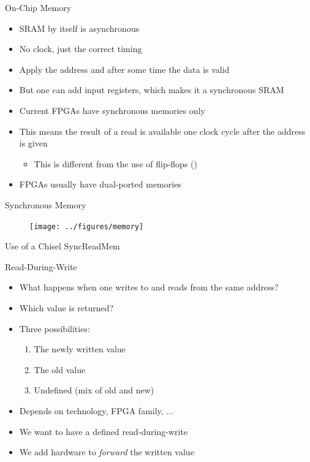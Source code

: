\begin{frame}[fragile]{On-Chip Memory}
\begin{itemize}
\item SRAM by itself is asynchronous
\item No clock, just the correct timing
\item Apply the address and after some time the data is valid
\item But one can add input registers, which makes it a synchronous SRAM
\item Current FPGAs have synchronous memories only
\item This means the result of a read is available one clock cycle after the address is given
\begin{itemize}
\item This is different from the use of flip-flops ()
\end{itemize}
\item FPGAs usually have dual-ported memories
\end{itemize}
\end{frame}

\begin{frame}[fragile]{Synchronous Memory}
\begin{figure}
  \texttt{[image: ../figures/memory]}
\end{figure}
\end{frame}

\begin{frame}[fragile]{Use of a Chisel SyncReadMem}
\end{frame}

\begin{frame}[fragile]{Read-During-Write}
\begin{itemize}
\item What happens when one writes to and reads from the same address?
\item Which value is returned?
\item Three possibilities:
\begin{enumerate}
\item The newly written value
\item The old value
\item Undefined (mix of old and new)
\end{enumerate}
\item Depends on technology, FPGA family, ...
\item We want to have a defined read-during-write
\item We add hardware to \emph{forward} the written value
\end{itemize}
\end{frame}

